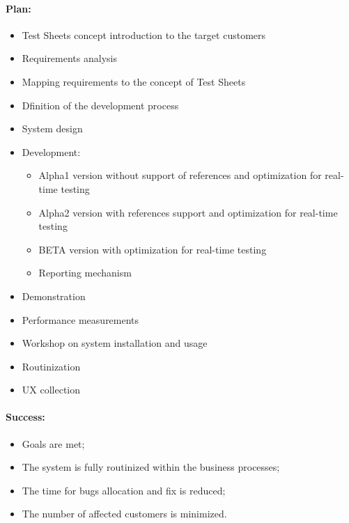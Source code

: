 \paragraph{Plan:}
\begin{itemize}
	\item Test Sheets concept introduction to the target customers
	\item Requirements analysis 
	\item Mapping requirements to the concept of Test Sheets
	\item Dfinition of the development process
	\item System design
	\item Development:
	\begin{itemize}
		\item Alpha1 version without support of references and optimization for real-time testing
		\item Alpha2 version with references support and optimization for real-time testing
		\item BETA version with optimization for real-time testing
		\item Reporting mechanism
	\end{itemize}
	\item Demonstration
	\item Performance measurements
	\item Workshop on system installation and usage
	\item Routinization
	\item UX collection
\end{itemize}

\paragraph{Success:}
\begin{itemize}
	\item Goals are met;
	\item The system is fully routinized within the business processes;
	\item The time for bugs allocation and fix is reduced;
	\item The number of affected customers is minimized.
\end{itemize}


